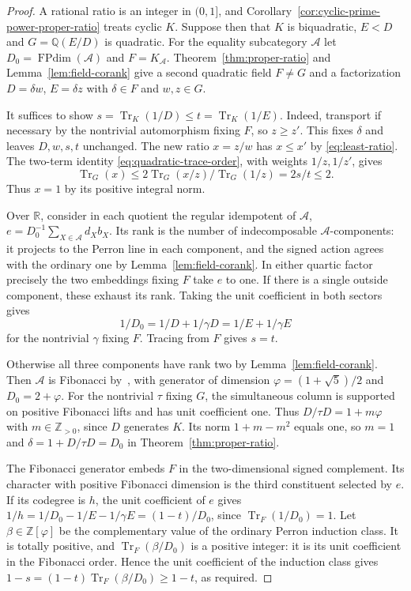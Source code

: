 \documentclass[11pt,reqno]{amsart}
\theoremstyle{remark}\newtheorem{remark}[theorem]{Remark}
\numberwithin{equation}{section}
\begin{document}
\begin{proof}
A rational ratio is an integer in $(0,1]$, and
Corollary~\ref{cor:cyclic-prime-power-proper-ratio} treats cyclic $K$.
Suppose then that $K$ is biquadratic, $E<D$ and $G=\mathbb Q(E/D)$ is
quadratic. For the equality subcategory $\mathcal A$ let
$D_0=\operatorname{FPdim}(\mathcal A)$ and $F=K_{\mathcal A}$.
Theorem~\ref{thm:proper-ratio} and Lemma~\ref{lem:field-corank} give
a second quadratic field $F\ne G$ and a factorization
$D=\delta w$, $E=\delta z$ with $\delta\in F$ and $w,z\in G$.

It suffices to show $s=\operatorname{Tr}_K(1/D)\le
t=\operatorname{Tr}_K(1/E)$. Indeed, transport if necessary by
the nontrivial automorphism fixing $F$, so $z\ge z'$. This fixes
$\delta$ and leaves $D,w,s,t$ unchanged. The new ratio $x=z/w$
has $x\le x'$ by \eqref{eq:least-ratio}. The two-term identity
\eqref{eq:quadratic-trace-order}, with weights $1/z,1/z'$, gives
\begin{equation}\label{eq:fib-quartic-shift}
 \operatorname{Tr}_G(x)\le
 2\operatorname{Tr}_G(x/z)/\operatorname{Tr}_G(1/z)=2s/t\le2.
\end{equation}
Thus $x=1$ by its positive integral norm.

Over $\mathbb R$, consider in each quotient the regular idempotent of $\mathcal A$,
$e=D_0^{-1}\sum_{X\in\mathcal A}d_X b_X$. Its rank is the number of
indecomposable $\mathcal A$-components: it projects to the Perron line
in each component, and the signed action agrees with the ordinary one
by Lemma~\ref{lem:field-corank}. In either quartic factor precisely
the two embeddings fixing $F$ take $e$ to one. If there is a single
outside component, these exhaust its rank. Taking the unit coefficient
in both sectors gives
\[
 1/D_0=1/D+1/\gamma D=1/E+1/\gamma E
\]
for the nontrivial $\gamma$ fixing $F$. Tracing from $F$ gives $s=t$.

Otherwise all three components have rank two by
Lemma~\ref{lem:field-corank}. Then $\mathcal A$ is Fibonacci
by~\cite{Ostrik2}, with generator of dimension
$\varphi=(1+\sqrt5)/2$ and $D_0=2+\varphi$. For the nontrivial $\tau$
fixing $G$, the simultaneous column is supported on positive
Fibonacci lifts and has unit coefficient one. Thus
$D/\tau D=1+m\varphi$ with $m\in\mathbb Z_{>0}$, since $D$ generates
$K$. Its norm $1+m-m^2$ equals one, so $m=1$ and
$\delta=1+D/\tau D=D_0$ in Theorem~\ref{thm:proper-ratio}.

The Fibonacci generator embeds $F$ in the two-dimensional signed
complement. Its character with positive Fibonacci dimension is the
third constituent selected by $e$. If its codegree is $h$, the unit
coefficient of $e$ gives
$1/h=1/D_0-1/E-1/\gamma E=(1-t)/D_0$, since
$\operatorname{Tr}_F(1/D_0)=1$. Let $\beta\in\mathbb Z[\varphi]$
be the complementary value of the ordinary Perron induction class.
It is totally positive, and $\operatorname{Tr}_F(\beta/D_0)$ is a
positive integer: it is its unit coefficient in the Fibonacci order.
Hence the unit coefficient of the induction class gives
$1-s=(1-t)\operatorname{Tr}_F(\beta/D_0)\ge1-t$, as required.
\end{proof}
\end{document}
